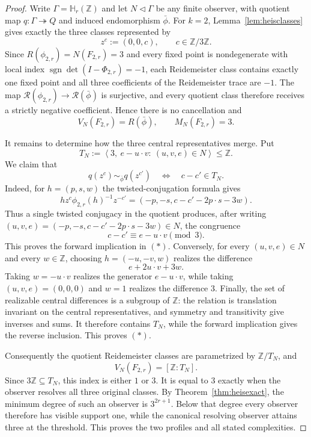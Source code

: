 \documentclass[11pt]{article}
\newcommand{\RN}{\mathcal R}
\newcommand{\Z}{\mathbb Z}
\newcommand{\Heis}{\mathbb H}
\begin{document}
\begin{proof}
Write $\Gamma=\Heis_r(\Z)$ and let
$N\triangleleft\Gamma$ be any finite observer, with quotient map
$q\colon\Gamma\twoheadrightarrow Q$ and induced endomorphism $\bar\phi$.
For $k=2$, Lemma~\ref{lem:heisclasses} gives exactly the three classes
represented by
\[
  z^c:=(0,0,c),\qquad c\in\Z/3\Z.
\]
Since $R(\phi_{2,r})=N(F_{2,r})=3$ and every fixed point is
nondegenerate with local index
$\operatorname{sgn}\det(I-\Phi_{2,r})=-1$, each Reidemeister class
contains exactly one fixed point and all three coefficients of the
Reidemeister trace are $-1$.  The map
$\RN(\phi_{2,r})\to\RN(\bar\phi)$ is surjective, and every quotient class
therefore receives a strictly negative coefficient.  Hence there is no
cancellation and
\[
  V_N(F_{2,r})=R(\bar\phi),
  \qquad
  M_N(F_{2,r})=3.
\]

It remains to determine how the three central representatives merge.  Put
\[
  T_N:=\left\langle
  3,\ e-u\!\cdot v:\ (u,v,e)\in N
  \right\rangle\le\Z.
\]
We claim that
\[
  q(z^c)\sim_{\bar\phi}q(z^{c'})
  \quad\Longleftrightarrow\quad
  c-c'\in T_N.
  \tag{\(*\)}
\]
Indeed, for $h=(p,s,w)$ the twisted-conjugation formula gives
\[
  h z^c\phi_{2,r}(h)^{-1}z^{-c'}
  =(-p,-s,c-c'-2p\!\cdot s-3w).
\]
Thus a single twisted conjugacy in the quotient produces, after writing
$(u,v,e)=(-p,-s,c-c'-2p\!\cdot s-3w)\in N$, the congruence
\[
  c-c'\equiv e-u\!\cdot v\pmod3.
\]
This proves the forward implication in $(*)$.  Conversely, for every
$(u,v,e)\in N$ and every $w\in\Z$, choosing $h=(-u,-v,w)$ realizes the
difference
\[
  e+2u\!\cdot v+3w.
\]
Taking $w=-u\!\cdot v$ realizes the generator $e-u\!\cdot v$, while
taking $(u,v,e)=(0,0,0)$ and $w=1$ realizes the difference $3$.  Finally,
the set of realizable central differences is a subgroup of $\Z$: the
relation is translation invariant on the central representatives, and
symmetry and transitivity give inverses and sums.  It therefore contains
$T_N$, while the forward implication gives the reverse inclusion.  This
proves $(*)$.

Consequently the quotient Reidemeister classes are parametrized by
$\Z/T_N$, and
\[
  V_N(F_{2,r})=[\Z:T_N].
\]
Since $3\Z\subseteq T_N$, this index is either $1$ or $3$.  It is equal to
$3$ exactly when the observer resolves all three original classes.  By
Theorem~\ref{thm:heisexact}, the minimum degree of such an observer is
$3^{2r+1}$.  Below that degree every observer therefore has visible support
one, while the canonical resolving observer attains three at the threshold.
This proves the two profiles and all stated complexities.
\end{proof}
\end{document}
